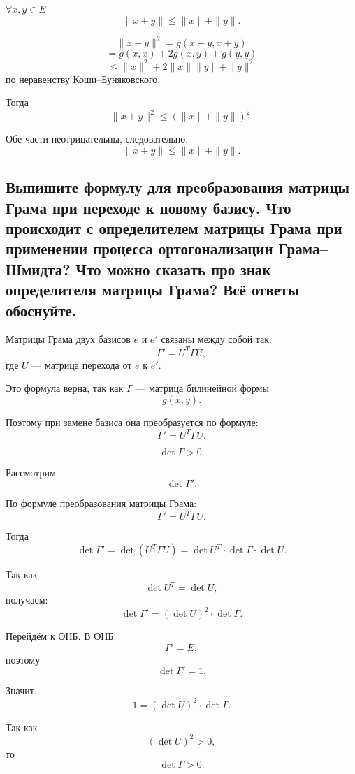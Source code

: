 \begin{theorem}
    $\forall x,y \in E$
    \[
        \|x+y\| \leq \|x\|+\|y\|.
    \]
\end{theorem}

\begin{Proof}
    \[
        \|x+y\|^2
        =
        g(x+y,x+y)
    \]
    \[
        =
        g(x,x)+2g(x,y)+g(y,y)
    \]
    \[
        \leq
        \|x\|^2+2\|x\|\|y\|+\|y\|^2
    \]
    по неравенству Коши--Буняковского.

    Тогда
    \[
        \|x+y\|^2
        \leq
        (\|x\|+\|y\|)^2.
    \]

    Обе части неотрицательны, следовательно,
    \[
        \|x+y\| \leq \|x\|+\|y\|.
    \]
\end{Proof}
\subsection{Выпишите формулу для преобразования матрицы Грама при переходе к новому базису. Что происходит с определителем матрицы Грама при применении процесса ортогонализации Грама--Шмидта? Что можно сказать про знак определителя матрицы Грама? Всё ответы обоснуйте.}

\begin{theorem}
    Матрицы Грама двух базисов $e$ и $e'$ связаны между собой так:
    \[
        \Gamma' = U^T \Gamma U,
    \]
    где $U$ --- матрица перехода от $e$ к $e'$.
\end{theorem}

\begin{Proof}
    Это формула верна, так как $\Gamma$ --- матрица билинейной формы
    \[
        g(x,y).
    \]
    
    Поэтому при замене базиса она преобразуется по формуле:
    \[
        \Gamma' = U^T \Gamma U.
    \]
\end{Proof}

\begin{theorem}
    \[
        \det \Gamma > 0.
    \]
\end{theorem}

\begin{Proof}
    Рассмотрим
    \[
        \det \Gamma'.
    \]
    
    По формуле преобразования матрицы Грама:
    \[
        \Gamma' = U^T \Gamma U.
    \]
    
    Тогда
    \[
        \det \Gamma'
        =
        \det(U^T\Gamma U)
        =
        \det U^T \cdot \det \Gamma \cdot \det U.
    \]
    
    Так как
    \[
        \det U^T = \det U,
    \]
    получаем:
    \[
        \det \Gamma'
        =
        (\det U)^2 \cdot \det \Gamma.
    \]
    
    Перейдём к ОНБ. В ОНБ
    \[
        \Gamma' = E,
    \]
    поэтому
    \[
        \det \Gamma' = 1.
    \]
    
    Значит,
    \[
        1 = (\det U)^2 \cdot \det \Gamma.
    \]
    
    Так как
    \[
        (\det U)^2 > 0,
    \]
    то
    \[
        \det \Gamma > 0.
    \]
\end{Proof}


